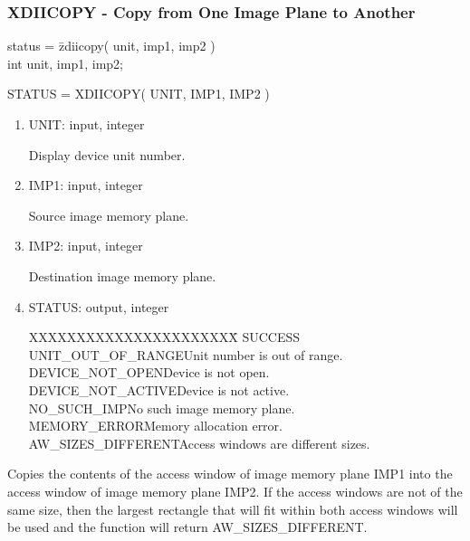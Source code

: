 \subsubsection{XDIICOPY - Copy from One Image Plane to Another}
\begin{tabbing}
status = \=zdiicopy( unit, imp1, imp2 )\\
\>int  unit, imp1, imp2;\\
\end{tabbing}
STATUS = XDIICOPY( UNIT, IMP1, IMP2 )
\begin{enumerate}
\item UNIT:  input, integer

Display device unit number.
\item IMP1:  input, integer

Source image memory plane.
\item IMP2:  input, integer

Destination image memory plane.
\item STATUS:  output, integer
\begin{tabbing}
XXXXXXXXXXXXXXXXXXXXXX\=\kill
SUCCESS\\
UNIT\_OUT\_OF\_RANGE\>Unit number is out of range.\\
DEVICE\_NOT\_OPEN\>Device is not open.\\
DEVICE\_NOT\_ACTIVE\>Device is not active.\\
NO\_SUCH\_IMP\>No such image memory plane.\\
MEMORY\_ERROR\>Memory allocation error.\\
AW\_SIZES\_DIFFERENT\>Access windows are different sizes.\\
\end{tabbing}
\end{enumerate}
Copies the contents of the access window of image memory plane IMP1
into the access window of image memory plane IMP2.  If the access
windows are not of the same size, then the largest rectangle that
will fit within both access windows will be used and the function will
return AW\_SIZES\_DIFFERENT.
\newpage
